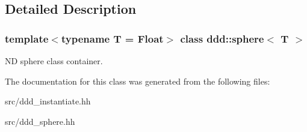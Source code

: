 \subsection{Detailed Description}
\subsubsection*{template$<$typename T = Float$>$\newline
class ddd\+::sphere$<$ T $>$}

ND sphere class container. 

The documentation for this class was generated from the following files\+:\begin{DoxyCompactItemize}
\item 
src/ddd\+\_\+instantiate.\+hh\item 
src/ddd\+\_\+sphere.\+hh\end{DoxyCompactItemize}
